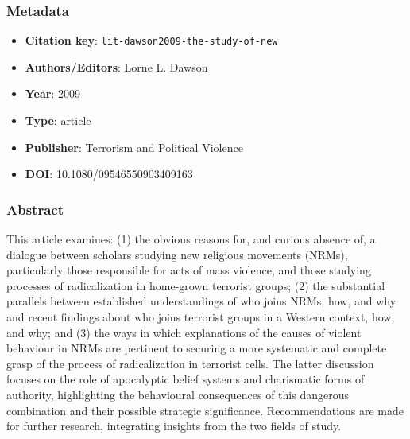 \subsubsection*{Metadata}
\begin{itemize}
  \item \textbf{Citation key}: \texttt{lit-dawson2009-the-study-of-new}
  \item \textbf{Authors/Editors}: Lorne L. Dawson
  \item \textbf{Year}: 2009
  \item \textbf{Type}: article
  \item \textbf{Publisher}: Terrorism and Political Violence
  \item \textbf{DOI}: 10.1080/09546550903409163
\end{itemize}
\subsubsection*{Abstract}
This article examines: (1) the obvious reasons for, and curious absence of, a dialogue between scholars studying new religious movements (NRMs), particularly those responsible for acts of mass violence, and those studying processes of radicalization in home-grown terrorist groups; (2) the substantial parallels between established understandings of who joins NRMs, how, and why and recent findings about who joins terrorist groups in a Western context, how, and why; and (3) the ways in which explanations of the causes of violent behaviour in NRMs are pertinent to securing a more systematic and complete grasp of the process of radicalization in terrorist cells. The latter discussion focuses on the role of apocalyptic belief systems and charismatic forms of authority, highlighting the behavioural consequences of this dangerous combination and their possible strategic significance. Recommendations are made for further research, integrating insights from the two fields of study.

